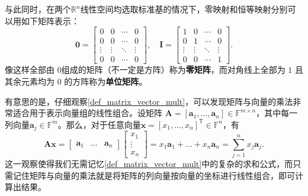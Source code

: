 与此同时，在两个\(\mathbb{R}^n\)线性空间均选取标准基的情况下，零映射和恒等映射分别可以用如下矩阵表示：
\[
    \mathbf{0}=
    \begin{bmatrix}
        0      & 0      & \cdots & 0      \\
        0      & 0      & \cdots & 0      \\
        \vdots & \vdots & \ddots & \vdots \\
        0      & 0      & \cdots & 0
    \end{bmatrix},
    \quad
    \mathbf{I}=
    \begin{bmatrix}
        1      & 0      & \cdots & 0      \\
        0      & 1      & \cdots & 0      \\
        \vdots & \vdots & \ddots & \vdots \\
        0      & 0      & \cdots & 1
    \end{bmatrix}.
\]
像这样全部由 \(0\)组成的矩阵（不一定是方阵）称为\textbf{零矩阵}，而对角线上全部为 \(1\) 且其余元素均为 \(0\) 的方阵称为\textbf{单位矩阵}。

有意思的是，仔细观察\cref{def_matrix_vector_mult}，可以发现矩阵与向量的乘法非常适合用于表示向量组的线性组合。设矩阵 \(\mathbf{A}=[\bm a_1,\ldots,\bm a_n]\in \mathbb{F}^{m \times n}\)，其中每一列向量\(\bm a_j\in \mathbb{F}^m\)。那么，对于任意向量\(\bm x=[x_1,\ldots,x_n]^{\mathsf T}\in \mathbb{F}^n\)，有
\[
    \mathbf{A}\bm x = \begin{bmatrix}
        \bm a_1 & \ldots & \bm a_n
    \end{bmatrix} \begin{bmatrix}
        x_1    \\
        \vdots \\
        x_n
    \end{bmatrix}
    = x_1\bm a_1 + \ldots + x_n\bm a_n = \sum_{j=1}^{n}x_j\bm a_j.
\]
这一观察使得我们无需记忆\cref{def_matrix_vector_mult}中的复杂的求和公式，而只需记住矩阵与向量的乘法就是将矩阵的列向量按向量的坐标进行线性组合，即可计算出结果。

